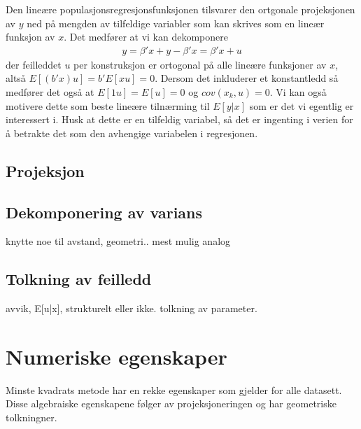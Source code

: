 Den lineære populasjonsregresjonsfunksjonen tilsvarer den ortgonale projeksjonen av $y$ ned på mengden av tilfeldige variabler som kan skrives som en lineær funksjon av $x$. Det medfører at vi kan dekomponere
\begin{align}
y = \beta'x+y-\beta'x = \beta'x+u
\end{align}
der feilleddet $u$ per konstruksjon er ortogonal på alle lineære funksjoner av $x$, altså $E[(b'x)u]=b'E[xu] = 0$. Dersom det inkluderer et konstantledd så medfører det også at $E[1u]=E[u]=0$ og $cov(x_k,u)=0$. Vi kan også motivere dette som beste lineære tilnærming til $E[y|x]$ som er det vi egentlig er interessert i. Husk at dette er en tilfeldig variabel, så det er ingenting i verien for å betrakte det som den avhengige variabelen i regresjonen.
\subsection{Projeksjon}
\subsection{Dekomponering av varians}
knytte noe til avstand, geometri.. mest mulig analog
\subsection{Tolkning av feilledd}
avvik, E[u|x], strukturelt eller ikke. tolkning av parameter.
\section{Numeriske egenskaper}
Minste kvadrats metode har en rekke egenskaper som gjelder for alle datasett. Disse algebraiske egenskapene følger av projeksjoneringen og har geometriske tolkningner.
